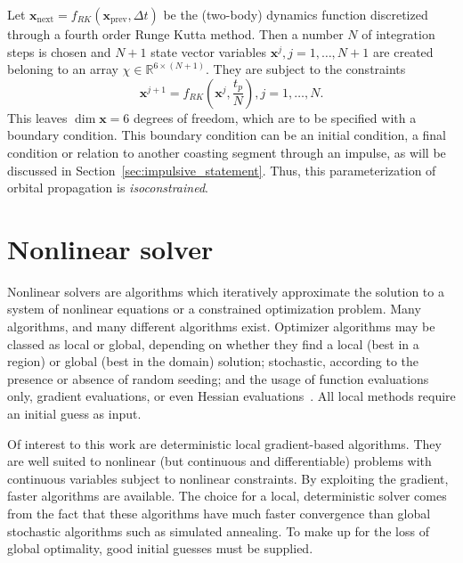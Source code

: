 Let \(\mathbf{x}_{\text{next}} = f_{RK}(\mathbf{x}_{\text{prev}}, \Delta t)\) be the (two-body) dynamics function discretized through a fourth order Runge Kutta method. Then a number \(N\) of integration steps is chosen and \(N+1\) state vector variables \(\mathbf{x}^j, j=1,\dots,N+1\) are created beloning to an array \(\chi \in \mathbb{R}^{6 \times (N+1)}\). They are subject to the constraints
\begin{equation}
    \mathbf{x}^{j+1} = f_{RK}(\mathbf{x}^j, \frac{t_p}{N}), j = 1, \dots, N.
\end{equation}
This leaves \(\dim \mathbf{x} = 6\) degrees of freedom, which are to be specified with a boundary condition. This boundary condition can be an initial condition, a final condition or relation to another coasting segment through an impulse, as will be discussed in Section~\ref{sec:impulsive_statement}. Thus, this parameterization of orbital propagation is \textit{isoconstrained}.

\section{Nonlinear solver}

Nonlinear solvers are algorithms which iteratively approximate the solution to a system of nonlinear equations or a constrained optimization problem. Many algorithms, and many different algorithms exist. Optimizer algorithms may be classed as local or global, depending on whether they find a local (best in a region) or global (best in the domain) solution; stochastic, according to the presence or absence of random seeding; and the usage of function evaluations only, gradient evaluations, or even Hessian evaluations~\cite{numerical_recipes}. All local methods require an initial guess as input.

Of interest to this work are deterministic local gradient-based algorithms. They are well suited to nonlinear (but continuous and differentiable) problems with continuous variables subject to nonlinear constraints. By exploiting the gradient, faster algorithms are available. The choice for a local, deterministic solver comes from the fact that these algorithms have much faster convergence than global stochastic algorithms such as simulated annealing. To make up for the loss of global optimality, good initial guesses must be supplied.

